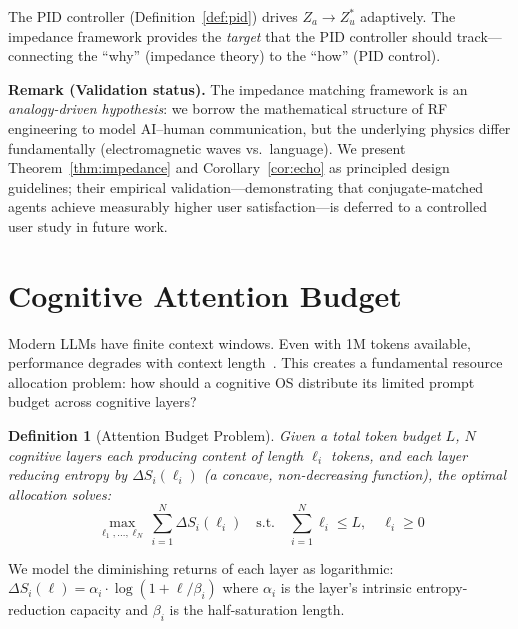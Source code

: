 \documentclass[11pt,a4paper]{article}
\newtheorem{definition}{Definition}
\begin{document}
The PID controller (Definition~\ref{def:pid}) drives $Z_a \to Z_u^*$
adaptively. The impedance framework provides the \emph{target} that the
PID controller should track---connecting the ``why'' (impedance theory)
to the ``how'' (PID control).

\noindent\textbf{Remark (Validation status).}
The impedance matching framework is an \emph{analogy-driven hypothesis}: we borrow the mathematical structure of RF engineering to model AI--human communication, but the underlying physics differ fundamentally (electromagnetic waves vs.\ language).
We present Theorem~\ref{thm:impedance} and Corollary~\ref{cor:echo} as principled design guidelines; their empirical validation---demonstrating that conjugate-matched agents achieve measurably higher user satisfaction---is deferred to a controlled user study in future work.


\section{Cognitive Attention Budget}
\label{sec:budget}

Modern LLMs have finite context windows. Even with 1M tokens available,
performance degrades with context length~\cite{anthropic_context}.
This creates a fundamental resource allocation problem: how should a
cognitive OS distribute its limited prompt budget across cognitive layers?

\begin{definition}[Attention Budget Problem]
\label{def:budget}
Given a total token budget $L$, $N$ cognitive layers each producing
content of length $\ell_i$ tokens, and each layer reducing entropy by
$\Delta S_i(\ell_i)$ (a concave, non-decreasing function), the optimal
allocation solves:
\begin{equation}
  \max_{\ell_1, \ldots, \ell_N} \sum_{i=1}^{N} \Delta S_i(\ell_i)
  \quad \text{s.t.} \quad \sum_{i=1}^{N} \ell_i \leq L, \quad \ell_i \geq 0
  \label{eq:budget}
\end{equation}
\end{definition}

We model the diminishing returns of each layer as logarithmic:
$\Delta S_i(\ell) = \alpha_i \cdot \log(1 + \ell / \beta_i)$
where $\alpha_i$ is the layer's intrinsic entropy-reduction capacity
and $\beta_i$ is the half-saturation length.
\end{document}
